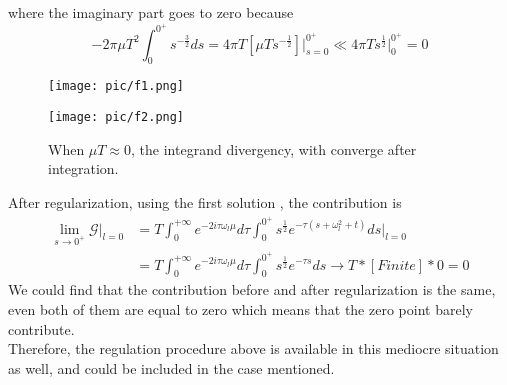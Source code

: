 \documentclass{article}
\begin{document}
where the imaginary part goes to zero because
\begin{equation}
    -2\pi \mu T^2\int_{0}^{0^+}s^{-\frac{3}{2}}ds
    =4\pi T \left[\mu T s^{-\frac{1}{2}}\right]\lvert_{s=0}^{0^+}
    \ll 4\pi T s^{\frac{1}{2}}\lvert_{0}^{0^+}
    =0 
\end{equation} 
\begin{figure}[H]
    \begin{minipage}{0.45\linewidth}
        \centering
        \texttt{[image: pic/f1.png]}
    \end{minipage}
    \hfill
    \begin{minipage}{0.45\linewidth}
        \centering
        \texttt{[image: pic/f2.png]}
    \end{minipage}
    \caption{When $\mu T\approx 0$, the integrand divergency, with converge after integration.}
\end{figure}
After regularization, using the first solution , the contribution is
\begin{equation}
    \begin{split}
    \lim_{s\rightarrow 0^+}\mathcal{G} \lvert_{l=0}
    &=T\int_{0}^{+\infty}e^{-2i\tau\omega_l\mu}d\tau\int_{0}^{0^+}s^{\frac{1}{2}} e^{-\tau\left(s+\omega_l^2+t\right)}ds\lvert_{l=0} \\
    &=T\int_{0}^{+\infty}e^{-2i\tau\omega_l\mu}d\tau\int_{0}^{0^+}s^{\frac{1}{2}} e^{-\tau s}ds\rightarrow T\ast\left[Finite\right]\ast0
    =0 
    \end{split}
\end{equation}
We could find that the contribution before and after regularization is the same, even both of them are equal to zero which means that the zero point barely contribute.\\
Therefore, the regulation procedure above is available in this mediocre situation as well, and could be included in the case mentioned.
\newpage
\end{document}
